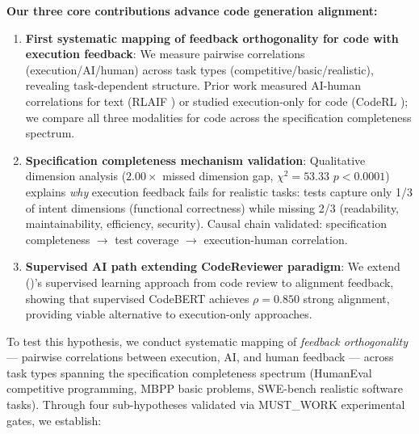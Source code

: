 \textbf{Our three core contributions advance code generation alignment:}

\begin{enumerate}
\item \textbf{First systematic mapping of feedback orthogonality for code with execution feedback}: We measure pairwise correlations (execution/AI/human) across task types (competitive/basic/realistic), revealing task-dependent structure. Prior work measured AI-human correlations for text (RLAIF \citeauthor{lee2023rlaif} \citeyear{lee2023rlaif}) or studied execution-only for code (CodeRL \citeauthor{le2022coderl} \citeyear{le2022coderl}); we compare all three modalities for code across the specification completeness spectrum.

\item \textbf{Specification completeness mechanism validation}: Qualitative dimension analysis ($2.00\times$ missed dimension gap, $\chi^2=53.33$ $p<0.0001$) explains \emph{why} execution feedback fails for realistic tasks: tests capture only 1/3 of intent dimensions (functional correctness) while missing 2/3 (readability, maintainability, efficiency, security). Causal chain validated: specification completeness $\rightarrow$ test coverage $\rightarrow$ execution-human correlation.

\item \textbf{Supervised AI path extending CodeReviewer paradigm}: We extend \citeauthor{li2022codereview} (\citeyear{li2022codereview})'s supervised learning approach from code review to alignment feedback, showing that supervised CodeBERT achieves $\rho=0.850$ strong alignment, providing viable alternative to execution-only approaches.
\end{enumerate}

To test this hypothesis, we conduct systematic mapping of \emph{feedback orthogonality} --- pairwise correlations between execution, AI, and human feedback --- across task types spanning the specification completeness spectrum (HumanEval competitive programming, MBPP basic problems, SWE-bench realistic software tasks). Through four sub-hypotheses validated via MUST\_WORK experimental gates, we establish:

